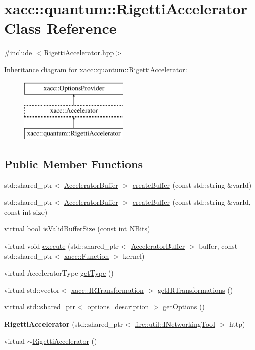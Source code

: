 \hypertarget{a00252}{}\section{xacc\+:\+:quantum\+:\+:Rigetti\+Accelerator Class Reference}
\label{a00252}


{\ttfamily \#include $<$Rigetti\+Accelerator.\+hpp$>$}

Inheritance diagram for xacc\+:\+:quantum\+:\+:Rigetti\+Accelerator\+:\begin{figure}[H]
\begin{center}
\leavevmode
\includegraphics[height=3.000000cm]{a00252}
\end{center}
\end{figure}
\subsection*{Public Member Functions}
\begin{DoxyCompactItemize}
\item 
std\+::shared\+\_\+ptr$<$ \hyperlink{a00032}{Accelerator\+Buffer} $>$ \hyperlink{a00252_ada3ceb986e51ab5aa721f2a08e083cd6}{create\+Buffer} (const std\+::string \&var\+Id)
\item 
std\+::shared\+\_\+ptr$<$ \hyperlink{a00032}{Accelerator\+Buffer} $>$ \hyperlink{a00252_a731551c94b1abef40d2cf032e8712df6}{create\+Buffer} (const std\+::string \&var\+Id, const int size)
\item 
virtual bool \hyperlink{a00252_a61352c07062597aad2393fbeed4cc025}{is\+Valid\+Buffer\+Size} (const int N\+Bits)
\item 
virtual void \hyperlink{a00252_afce7bbd1b0f04300a9920952e9d12ef4}{execute} (std\+::shared\+\_\+ptr$<$ \hyperlink{a00032}{Accelerator\+Buffer} $>$ buffer, const std\+::shared\+\_\+ptr$<$ \hyperlink{a00106}{xacc\+::\+Function} $>$ kernel)
\item 
virtual Accelerator\+Type \hyperlink{a00252_aab0d4674da5273d55407b9ab77cde890}{get\+Type} ()
\item 
virtual std\+::vector$<$ \hyperlink{a00168}{xacc\+::\+I\+R\+Transformation} $>$ \hyperlink{a00252_a443683a1dfb000603c640b2ee303cf66}{get\+I\+R\+Transformations} ()
\item 
virtual std\+::shared\+\_\+ptr$<$ options\+\_\+description $>$ \hyperlink{a00252_a9ee9e62aecbccf193894ca3388676f9f}{get\+Options} ()
\item 
{\bfseries Rigetti\+Accelerator} (std\+::shared\+\_\+ptr$<$ \hyperlink{a00156}{fire\+::util\+::\+I\+Networking\+Tool} $>$ http)\hypertarget{a00252_aa92ba39441ec9c261fbddee23a84d6ac}{}\label{a00252_aa92ba39441ec9c261fbddee23a84d6ac}

\item 
virtual \hyperlink{a00252_a7c86895d1c29afa8b7e18476144a3fcf}{$\sim$\+Rigetti\+Accelerator} ()
\end{DoxyCompactItemize}
